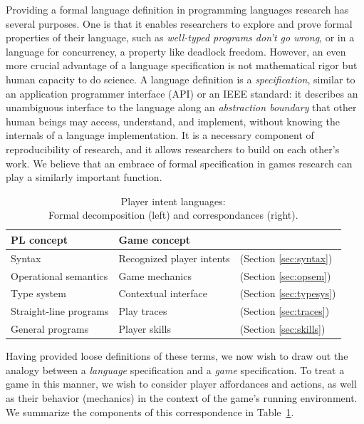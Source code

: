   Providing a formal language definition in programming languages research
  has several purposes. One is that it enables researchers to explore
  and prove formal properties of their language, such as {\em well-typed
  programs don't go wrong}, or in a language for concurrency, a property
  like deadlock freedom. However, an even more crucial advantage of a
  language specification is not mathematical rigor but human capacity to do
  science. A language definition is a {\em specification}, similar to an
  application programmer interface (API) or an IEEE standard: it describes
  an unambiguous interface to the language along an {\em abstraction
  boundary} that other human beings may access, understand, and implement,
  without knowing the internals of a language implementation.  It is a
  necessary component of reproducibility of research, and it allows
  researchers to build on each other's work. We believe that an embrace of
  formal specification in games research can play a similarly important
  function.

  \begin{table}
  \begin{tabular}{l|ll}
    PL concept & Game concept\\
    \hline
    Syntax & Recognized player intents & (Section \ref{sec:syntax})\\
    Operational semantics & Game mechanics & (Section \ref{sec:opsem})\\
    Type system & Contextual interface & (Section \ref{sec:typesys})\\
    Straight-line programs & Play traces & (Section \ref{sec:traces})\\ 
    General programs & Player skills & (Section \ref{sec:skills})
    \\
    \hline
  \end{tabular}
  \caption{Player intent languages: 
    \\
    Formal decomposition (left) and correspondances (right).}
  \label{tab:correspondence}
  \end{table}

  Having provided loose definitions of these terms, we now wish to draw out
  the analogy between a {\em language} specification and a {\em game}
  specification. To treat a game in this manner, we wish to consider player
  affordances and actions, as well as their behavior (mechanics) in the
  context of the game's running environment. We summarize the components of
  this correspondence in Table~\ref{tab:correspondence}.

